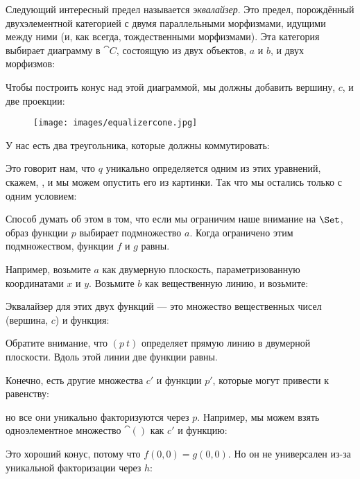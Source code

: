 Следующий интересный предел называется \emph{эквалайзер}. Это предел,
порождённый двухэлементной категорией с двумя параллельными морфизмами, идущими
между ними (и, как всегда, тождественными морфизмами). Эта категория
выбирает диаграмму в $\cat{C}$, состоящую из двух объектов, $a$ и
$b$, и двух морфизмов:


Чтобы построить конус над этой диаграммой, мы должны добавить вершину, $c$,
и две проекции:


\begin{figure}[H]
  \centering
  \texttt{[image: images/equalizercone.jpg]}
\end{figure}

\noindent
У нас есть два треугольника, которые должны коммутировать:


Это говорит нам, что $q$ уникально определяется одним из этих
уравнений, скажем, , и мы можем опустить его из
картинки. Так что мы остались только с одним условием:


Способ думать об этом в том, что если мы ограничим наше внимание на
$\Set$, образ функции $p$ выбирает подмножество
$a$. Когда ограничено этим подмножеством, функции $f$ и
$g$ равны.

Например, возьмите $a$ как двумерную плоскость,
параметризованную координатами $x$ и $y$. Возьмите $b$
как вещественную линию, и возьмите:


Эквалайзер для этих двух функций --- это множество вещественных чисел (вершина,
$c$) и функция:


Обратите внимание, что $(p~t)$ определяет прямую линию в
двумерной плоскости. Вдоль этой линии две функции равны.

Конечно, есть другие множества $c'$ и функции
$p'$, которые могут привести к равенству:


но все они уникально факторизуются через $p$. Например, мы
можем взять одноэлементное множество $\cat{()}$ как $c'$ и
функцию:


Это хороший конус, потому что $f (0, 0) = g (0, 0)$. Но он
не универсален из-за уникальной факторизации через $h$:

